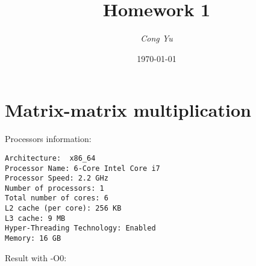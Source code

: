 \documentclass[titlepage]{article}
\title{
    Homework 1
}
\author{\itshape Cong Yu}
\date{\today}
\begin{document}
\maketitle

\setlength{\parindent}{0em}
\setlength{\parskip}{0.5em}

\section{Matrix-matrix multiplication}

Processors information: 

\begin{verbatim}
Architecture:  x86_64
Processor Name: 6-Core Intel Core i7
Processor Speed: 2.2 GHz 
Number of processors: 1 
Total number of cores: 6 
L2 cache (per core): 256 KB 
L3 cache: 9 MB 
Hyper-Threading Technology: Enabled    
Memory: 16 GB 
\end{verbatim}

Result with -O0:
\end{document}
